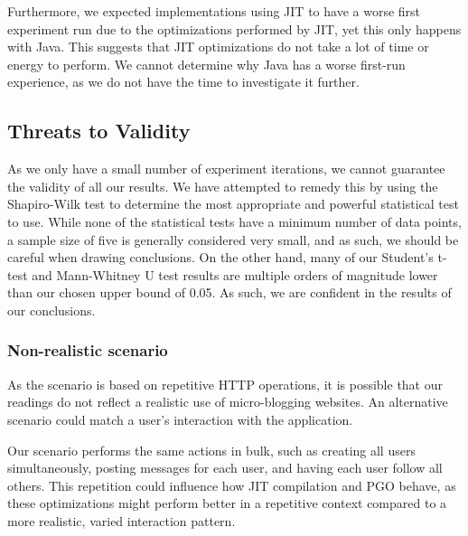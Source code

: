 \documentclass[main.tex]{subfiles}
\begin{document}
Furthermore, we expected implementations using JIT to have a worse first experiment run due to the optimizations performed by JIT, yet this only happens with Java. This suggests that JIT optimizations do not take a lot of time or energy to perform. We cannot determine why Java has a worse first-run experience, as we do not have the time to investigate it further.

\subsection{Threats to Validity}
\label{section:threats-to-validity}

As we only have a small number of experiment iterations, we cannot guarantee the validity of all our results. We have attempted to remedy this by using the Shapiro-Wilk test to determine the most appropriate and powerful statistical test to use. While none of the statistical tests have a minimum number of data points, a sample size of five is generally considered very small, and as such, we should be careful when drawing conclusions. On the other hand, many of our Student's t-test and Mann-Whitney U test results are multiple orders of magnitude lower than our chosen upper bound of 0.05. As such, we are confident in the results of our conclusions.

\subsubsection{Non-realistic scenario}
As the scenario is based on repetitive HTTP operations, it is possible that our readings do not reflect a realistic use of micro-blogging websites. An alternative scenario could match a user's interaction with the application.

Our scenario performs the same actions in bulk, such as creating all users simultaneously, posting messages for each user, and having each user follow all others. This repetition could influence how JIT compilation and PGO behave, as these optimizations might perform better in a repetitive context compared to a more realistic, varied interaction pattern.
\end{document}
